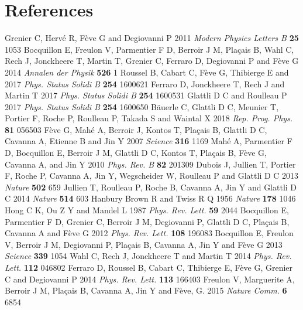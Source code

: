 \documentclass[12pt]{iopart}
\begin{document}
\section*{References}
\begin{thebibliography}{999}
%
 Grenier C, Hervé R, Fève G and Degiovanni P 2011 \emph{Modern Physics Letters B} \textbf{25} 1053
%
 Bocquillon E, Freulon V, Parmentier F D, Berroir J M, Plaçais B, Wahl C, Rech J, Jonckheere T, Martin T, Grenier C, Ferraro D, Degiovanni P and Fève G 2014 \emph{Annalen der Physik} \textbf{526} 1
%
 Roussel B, Cabart C, F\`eve G, Thibierge E and 2017 {\em Phys. Status Solidi B} \textbf{254} 1600621
%
 Ferraro D, Jonckheere T, Rech J and Martin T 2017 \emph{Phys. Status Solidi B} \textbf{254} 1600531
%
 Glattli D C and Roulleau P 2017 {\em Phys. Status Solidi B} \textbf{254} 1600650
%
 B\"auerle C, Glattli D C, Meunier T, Portier F, Roche P, Roulleau P, Takada S and Waintal X 2018 \emph{Rep. Prog. Phys.} \textbf{81} 056503
%
 Fève G, Mahé A, Berroir J, Kontos T, Plaçais B, Glattli D C, Cavanna A, Etienne B and Jin Y 2007 \emph{Science} \textbf{316} 1169
%
 Mah\'e A, Parmentier F D, Bocquillon E, Berroir J M, Glattli D C, Kontos T, Pla\c cais B, Fève G, Cavanna A, and Jin Y 2010 \emph{Phys. Rev. B} \textbf{82} 201309
%
 Dubois J, Jullien T, Portier F, Roche P, Cavanna A, Jin Y, Wegscheider W, Roulleau P and Glattli D C 2013 \emph{Nature} \textbf{502} 659
%
 Jullien T, Roulleau P, Roche B, Cavanna A, Jin Y and Glattli D C 2014 \emph{Nature} \textbf{514} 603
%
 Hanbury Brown R and Twiss R Q 1956 \emph{Nature} \textbf{178} 1046
%
 Hong C K, Ou Z Y and Mandel L 1987 \emph{Phys. Rev. Lett.} \textbf{59} 2044
%
 Bocquillon E, Parmentier F D, Grenier C, Berroir J M, Degiovanni P, Glattli D C, Plaçais B, Cavanna A and Fève G 2012 \emph{Phys. Rev. Lett.} \textbf{108} 196083
%
 Bocquillon E, Freulon V, Berroir J M, Degiovanni P, Plaçais B, Cavanna A, Jin Y and Fève G 2013 \emph{Science} \textbf{339} 1054
%
 Wahl C, Rech J, Jonckheere T and Martin T 2014 \emph{Phys. Rev. Lett.} \textbf{112} 046802
%
 Ferraro D, Roussel B, Cabart C, Thibierge E, F\`eve G, Grenier C and Degiovanni P 2014 \emph{Phys. Rev. Lett.} \textbf{113} 166403 
%
 Freulon V, Marguerite A, Berroir J M, Plaçais B, Cavanna A, Jin Y and Fève, G. 2015 \emph{Nature Comm.} \textbf{6} 6854

\end{thebibliography}
\end{document}
